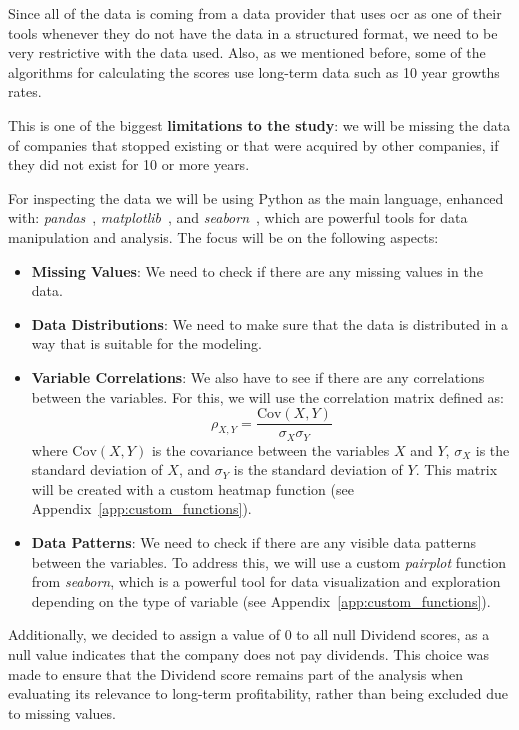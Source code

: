 \documentclass[11pt,english,a4paper,hidelinks]{book}
\begin{document}
Since all of the data is coming from a data provider that uses \acrshort{ocr} as one of their tools whenever they do not have the data in a structured format, we need to be very restrictive with the data used. Also, as we mentioned before, some of the algorithms for calculating the scores use long-term data such as 10 year growths rates.

\vspace{0.5cm}
\noindent This is one of the biggest \textbf{limitations to the study}: we will be missing the data of companies that stopped existing or that were acquired by other companies, if they did not exist for 10 or more years.

\vspace{0.5cm}
\noindent For inspecting the data we will be using Python as the main language, enhanced with: \textit{pandas}~\cite{pandas2025}, \textit{matplotlib}~\cite{matplotlib2025doc}, and \textit{seaborn}~\cite{seaborn2025}, which are powerful tools for data manipulation and analysis. The focus will be on the following aspects:
\begin{itemize}
  \item \textbf{Missing Values}: We need to check if there are any missing values in the data.
  \item \textbf{Data Distributions}: We need to make sure that the data is distributed in a way that is suitable for the modeling.
  \item \textbf{Variable Correlations}: We also have to see if there are any correlations between the variables. For this, we will use the correlation matrix defined as:
  \begin{equation}
    \rho_{X,Y} = \frac{\text{Cov}(X,Y)}{\sigma_X \sigma_Y}
  \end{equation}
  where \(\text{Cov}(X,Y)\) is the covariance between the variables \(X\) and \(Y\), \(\sigma_X\) is the standard deviation of \(X\), and \(\sigma_Y\) is the standard deviation of \(Y\). This matrix will be created with a custom heatmap function (see Appendix~\ref{app:custom_functions}).
  \item \textbf{Data Patterns}: We need to check if there are any visible data patterns between the variables. To address this, we will use a custom \textit{\acrshort{pairplot}} function from \textit{seaborn}, which is a powerful tool for data visualization and exploration  depending on the type of variable (see Appendix~\ref{app:custom_functions}).
\end{itemize}

\vspace{0.5cm}
\noindent Additionally, we decided to assign a value of 0 to all null Dividend scores, as a null value indicates that the company does not pay dividends. This choice was made to ensure that the Dividend score remains part of the analysis when evaluating its relevance to long-term profitability, rather than being excluded due to missing values.
\end{document}
